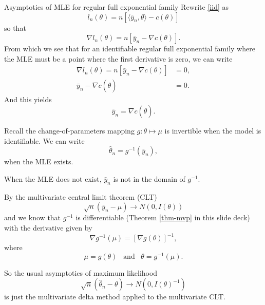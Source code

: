 \documentclass[
  ignorenonframetext,
]{beamer}
\begin{document}
\begin{frame}{Asymptotics of MLE for regular full exponential family}
\protect\hypertarget{asymptotics-of-mle-for-regular-full-exponential-family}{}
Rewrite \eqref{iid} as \[
  l_n(\theta) = n\left[\langle \bar y_n, \theta\rangle - c(\theta)\right]
\] so that \[
  \nabla l_n(\theta) = n\left[\bar y_n - \nabla c(\theta)\right].
\] From which we see that for an identifiable regular full exponential
family where the MLE must be a point where the first derivative is zero,
we can write \begin{align*}
    \nabla l_n(\theta) = n\left[\bar y_n - \nabla c(\theta)\right] &= 0, \\
    \bar y_n - \nabla c(\hat\theta) &= 0.
\end{align*} And this yields \[
  \bar y_n = \nabla c(\hat\theta).
\]
\end{frame}

\begin{frame}{}
\protect\hypertarget{section-3}{}
Recall the change-of-parameters mapping \(g:\theta \mapsto \mu\) is
invertible when the model is identifiable. We can write
\begin{equation} \label{MVPg}
  \hat\theta_n = g^{-1}(\bar y_n),  
\end{equation} when the MLE exists.

When the MLE does not exist, \(\bar y_n\) is not in the domain of
\(g^{-1}\).
\end{frame}

\begin{frame}{}
\protect\hypertarget{section-4}{}
By the multivariate central limit theorem (CLT) \[
  \sqrt{n}\left(\bar y_n - \mu\right) \to N\left(0, I(\theta)\right)
\] and we know that \(g^{-1}\) is differentiable (Theorem \ref{thm-mvp}
in this slide deck) with the derivative given by \[
  \nabla g^{-1}(\mu) = \left[\nabla g(\theta)\right]^{-1},
\] where \[
  \mu = g(\theta) \;\;\; \text{and} \;\;\; \theta = g^{-1}(\mu).
\]
\end{frame}

\begin{frame}{}
\protect\hypertarget{section-5}{}
So the usual asymptotics of maximum likelihood
\begin{equation} \label{asymptoticsMLE}
    \sqrt{n}\left(\hat\theta_n - \theta\right) \to N\left(0, I(\theta)^{-1}\right)
\end{equation} is just the multivariate delta method applied to the
multivariate CLT.
\end{frame}
\end{document}
